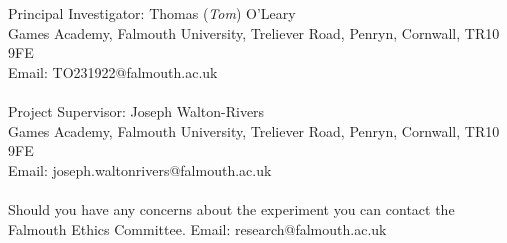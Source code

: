 \documentclass{article}
\begin{document}
\section*{}
Principal Investigator: Thomas (\textit{Tom}) O’Leary
\\
Games Academy, Falmouth University, Treliever Road, Penryn, Cornwall, TR10 9FE
\\
Email: TO231922@falmouth.ac.uk
\\
\\
Project Supervisor: Joseph Walton-Rivers
\\
Games Academy, Falmouth University, Treliever Road, Penryn, Cornwall, TR10 9FE
\\
Email: joseph.waltonrivers@falmouth.ac.uk
\\
\\
Should you have any concerns about the experiment you can contact the
Falmouth Ethics Committee.
Email: research@falmouth.ac.uk
\end{document}
